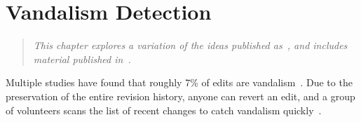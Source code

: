 \chapter{Vandalism Detection}
\label{ch:vandalism}

\begin{quote}
\textit{This chapter explores a variation of the ideas
published as~\cite{Adler2010}, and includes material
published in~\cite{Adler2011}.}
\end{quote}

Multiple studies have found that roughly 7\% of edits are
vandalism~\cite{Potthast2008,Potthast2010a}.
Due to the preservation of the entire revision history,
anyone can revert an edit, and a group of volunteers scans the
list of recent changes to catch vandalism
quickly~\cite{wiki:RCPatrol}.






